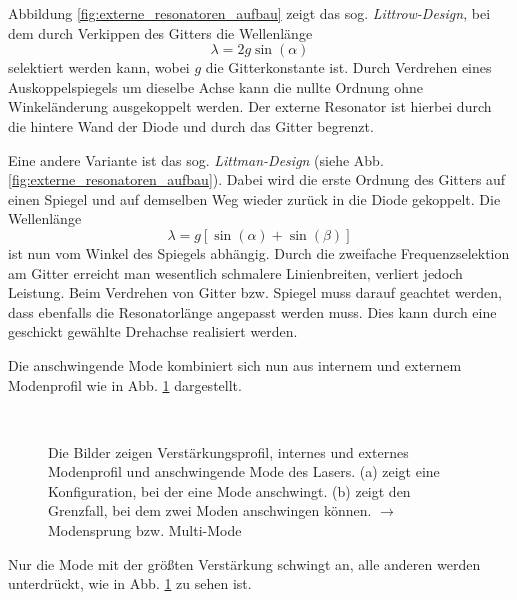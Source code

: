 Abbildung
\ref{fig:externe_resonatoren_aufbau} zeigt das sog.
\textit{Littrow-Design}, bei dem durch Verkippen des Gitters die Wellenlänge
\begin{equation}\label{eq:littrow}
	\lambda=2g\sin{(\alpha)}
\end{equation}
selektiert werden kann, wobei $g$ die Gitterkonstante ist. Durch Verdrehen eines
Auskoppelspiegels um dieselbe Achse kann die nullte Ordnung ohne Winkeländerung ausgekoppelt werden. Der
externe Resonator ist hierbei durch die hintere Wand der Diode und durch das
Gitter begrenzt.\par
Eine andere Variante ist das sog. \textit{Littman-Design} (siehe Abb.
\ref{fig:externe_resonatoren_aufbau}).
Dabei wird die erste Ordnung des Gitters auf einen Spiegel und auf demselben Weg wieder zurück in die
Diode gekoppelt. Die Wellenlänge
\begin{equation}\label{eq:littmann}
	\lambda=g\left[\sin{(\alpha)}+\sin{(\beta)}\right]
\end{equation}
ist nun vom Winkel des Spiegels abhängig. Durch die zweifache Frequenzselektion
am Gitter erreicht man wesentlich schmalere Linienbreiten, verliert jedoch
Leistung. Beim Verdrehen von Gitter bzw. Spiegel muss darauf geachtet werden,
dass ebenfalls die Resonatorlänge angepasst werden muss. Dies kann durch
eine geschickt gewählte Drehachse realisiert werden.\par
Die anschwingende Mode kombiniert sich nun aus internem und externem Modenprofil
wie in Abb. \ref{fig:moden_frequenzselektion} dargestellt.
\begin{figure}[h]
	\footnotesize	
	\centering
	\subfloat[]{
		\label{subfig:moden_frequenzselektion_a}
		
  	}\\
	\subfloat[]{
		\label{subfig:moden_frequenzselektion_b}
		
  	}
	\caption[Diodenlaser - Verstärkungsprofil]{Die Bilder zeigen
	Verstärkungsprofil, internes und externes Modenprofil und anschwingende
	Mode des Lasers. (a) zeigt eine Konfiguration, bei der eine Mode anschwingt.
	(b) zeigt den Grenzfall, bei dem zwei Moden anschwingen können. $\rightarrow$
	Modensprung bzw. Multi-Mode}
	\label{fig:moden_frequenzselektion}
\end{figure}
Nur die Mode mit der größten Verstärkung schwingt an, alle anderen
werden unterdrückt, wie in Abb.
\ref{fig:moden_frequenzselektion} zu sehen ist.
